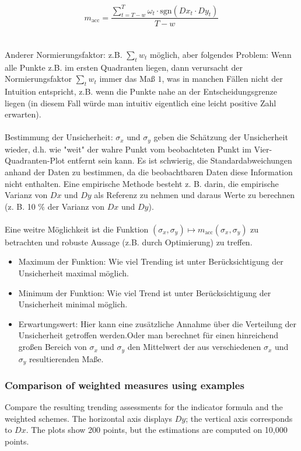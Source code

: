 \documentclass[oneside]{article}
\theoremstyle{plain}%
\theoremstyle{definition}
\newcommand{\ydiff}{D y}
\newcommand{\xdiff}{Dx}
\begin{document}
\[m_{\text{acc}} = \frac{\sum_{t=T-w}^T \omega_t \cdot \text{sgn}(Dx_t\cdot Dy_t)}{T-w}\]\\\\
Anderer Normierungsfaktor: z.B. $\sum_t w_t$ möglich, aber folgendes Problem: Wenn alle Punkte z.B. im ersten Quadranten liegen, dann verursacht der Normierungsfaktor $\sum_t w_t$ immer das Maß $1$, was in manchen Fällen nicht der Intuition entspricht, z.B. wenn die Punkte nahe an der Entscheidungsgrenze liegen (in diesem Fall würde man intuitiv eigentlich eine leicht positive Zahl erwarten). \\\\
Bestimmung der Unsicherheit: $\sigma_x$ und $\sigma_y$ geben die Schätzung der Unsicherheit wieder, d.h. wie "weit" der wahre Punkt vom beobachteten Punkt im Vier-Quadranten-Plot entfernt sein kann. Es ist schwierig, die Standardabweichungen anhand der Daten zu bestimmen, da die beobachtbaren Daten diese Information nicht enthalten. Eine empirische Methode besteht z. B. darin, die empirische Varianz von $Dx$ und $Dy$ als Referenz zu nehmen und daraus Werte zu berechnen (z. B. 10 $\%$ der Varianz von $Dx$ und $Dy$).\\\\
Eine weitre Möglichkeit ist die Funktion $(\sigma_x,\sigma_y)\mapsto m_{\text{acc}}(\sigma_x,\sigma_y)$ zu betrachten und robuste Aussage (z.B. durch Optimierung) zu treffen. 

\begin{itemize}
     \item Maximum der Funktion: Wie viel Trending ist unter Berücksichtigung der Unsicherheit maximal möglich.
    \item Minimum der Funktion: Wie viel Trend ist unter Berücksichtigung der Unsicherheit minimal möglich.
    \item Erwartungswert: Hier kann eine zusätzliche Annahme über die Verteilung der Unsicherheit getroffen werden.Oder man berechnet für einen hinreichend großen Bereich von $\sigma_x$ und $\sigma_y$ den Mittelwert der aus verschiedenen $\sigma_x$ und $\sigma_y$ resultierenden Maße.
\end{itemize}

\newpage
\subsubsection{Comparison of weighted measures using examples} \label{subsec:w1-w2}

Compare the resulting trending assessments for the indicator formula and the weighted schemes. The horizontal axis displays $\ydiff$; the vertical axis corresponds to $\xdiff$. 
The plots show 200 points, but the estimations are computed on 10,000 points.
\end{document}
